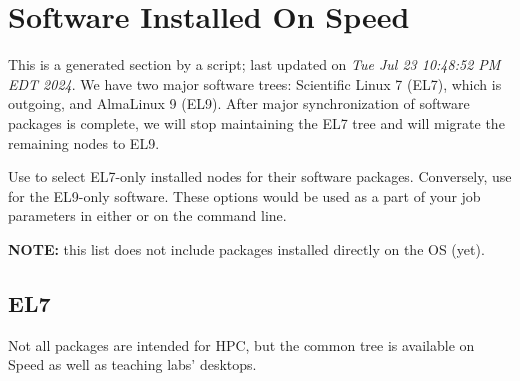 \section{Software Installed On Speed}
\label{sect:software-list}

This is a generated section by a script; last updated on \textit{Tue Jul 23 10:48:52 PM EDT 2024}.
We have two major software trees: Scientific Linux 7 (EL7), which is outgoing,
and AlmaLinux 9 (EL9). After major synchronization of software packages is complete,
we will stop maintaining the EL7 tree and will migrate the remaining nodes to EL9.

Use  to select EL7-only installed nodes for their software packages.
Conversely, use  for the EL9-only software.
These options would be used as a part of your job parameters in either  or on the command line.

\noindent\textbf{NOTE:} this list does not include packages installed directly on the OS (yet).

\subsection{EL7}
\label{sect:software-el7}

Not all packages are intended for HPC, but the common tree is available on Speed as well as teaching labs' desktops.

